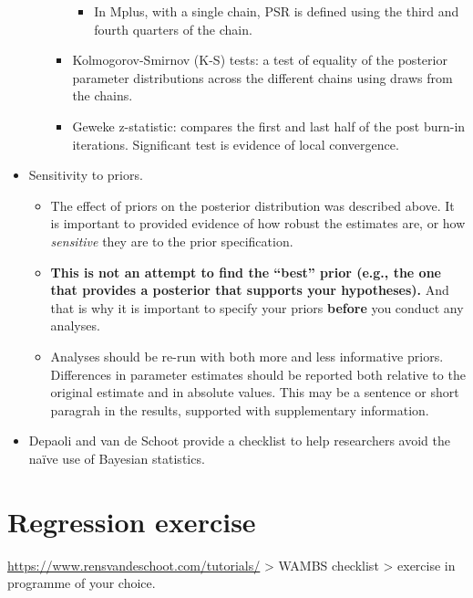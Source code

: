 \documentclass[]{book}
\providecommand{\tightlist}{%
  \setlength{\itemsep}{0pt}\setlength{\parskip}{0pt}}
\begin{document}
\begin{itemize}
\begin{itemize}
\begin{itemize}
      \begin{itemize}
      \tightlist
      \item
        In Mplus, with a single chain, PSR is defined using the third and fourth quarters of the chain.
      \end{itemize}
    \item
      Kolmogorov-Smirnov (K-S) tests: a test of equality of the posterior parameter distributions across the different chains using draws from the chains.
    \item
      Geweke z-statistic: compares the first and last half of the post burn-in iterations. Significant test is evidence of local convergence.
    \end{itemize}
  \end{itemize}
\item
  Sensitivity to priors.

  \begin{itemize}
  \tightlist
  \item
    The effect of priors on the posterior distribution was described above. It is important to provided evidence of how robust the estimates are, or how \emph{sensitive} they are to the prior specification.
  \item
    \textbf{This is not an attempt to find the ``best'' prior (e.g., the one that provides a posterior that supports your hypotheses).} And that is why it is important to specify your priors \textbf{before} you conduct any analyses.
  \item
    Analyses should be re-run with both more and less informative priors. Differences in parameter estimates should be reported both relative to the original estimate and in absolute values. This may be a sentence or short paragrah in the results, supported with supplementary information.
  \end{itemize}
\item
  Depaoli and van de Schoot \citep{Depaoli2017} provide a checklist to help researchers avoid the naïve use of Bayesian statistics.
\end{itemize}

\hypertarget{regression-exercise}{%
\section{Regression exercise}\label{regression-exercise}}

\url{https://www.rensvandeschoot.com/tutorials/} \textgreater{} WAMBS checklist \textgreater{} exercise in programme of your choice.
\end{document}
